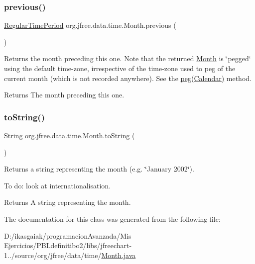 \subsubsection{\texorpdfstring{previous()}{previous()}}
{\footnotesize\ttfamily \mbox{\hyperlink{classorg_1_1jfree_1_1data_1_1time_1_1_regular_time_period}{Regular\+Time\+Period}} org.\+jfree.\+data.\+time.\+Month.\+previous (\begin{DoxyParamCaption}{ }\end{DoxyParamCaption})}

Returns the month preceding this one. Note that the returned \mbox{\hyperlink{classorg_1_1jfree_1_1data_1_1time_1_1_month}{Month}} is \char`\"{}pegged\char`\"{} using the default time-\/zone, irrespective of the time-\/zone used to peg of the current month (which is not recorded anywhere). See the \mbox{\hyperlink{classorg_1_1jfree_1_1data_1_1time_1_1_month_aabe5e5b144b7404d24109c8bee8c5519}{peg(\+Calendar)}} method.

\begin{DoxyReturn}{Returns}
The month preceding this one. 
\end{DoxyReturn}
\mbox{\label{classorg_1_1jfree_1_1data_1_1time_1_1_month_a531787416446452254611779b899dac1}} 
\subsubsection{\texorpdfstring{to\+String()}{toString()}}
{\footnotesize\ttfamily String org.\+jfree.\+data.\+time.\+Month.\+to\+String (\begin{DoxyParamCaption}{ }\end{DoxyParamCaption})}

Returns a string representing the month (e.\+g. \char`\"{}\+January 2002\char`\"{}). 

To do\+: look at internationalisation.

\begin{DoxyReturn}{Returns}
A string representing the month. 
\end{DoxyReturn}


The documentation for this class was generated from the following file\+:\begin{DoxyCompactItemize}
\item 
D\+:/ikasgaiak/programacion\+Avanzada/\+Mis Ejercicios/\+P\+B\+Ldefinitibo2/libs/jfreechart-\/1../source/org/jfree/data/time/\mbox{\hyperlink{_month_8java}{Month.\+java}}\end{DoxyCompactItemize}
